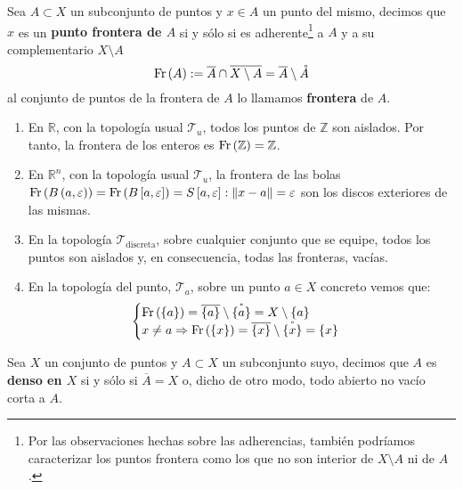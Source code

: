\begin{defi}[Frontera]
Sea $A\subset X$ un subconjunto de puntos y $x\in A$ un punto del mismo, decimos que $x$ es un \textbf{punto frontera de $A$} si y sólo si es adherente\footnote{Por las observaciones hechas sobre las adherencias, también podríamos caracterizar los puntos frontera como los que no son interior de $X \setminus A$ ni de $A$.} a $A$ y a su complementario $X \setminus A$
    \[
    \operatorname{Fr}\left( A \right) := \overline{A} \cap \overline{X \setminus A} = \overline{A} \setminus \mathring{A}     
    \]
al conjunto de puntos de la frontera de $A$ lo llamamos \textbf{frontera} de $A$.
\end{defi}

\begin{ej}
\begin{enumerate}
    \item En $\mathbb{R}$, con la topología usual $\mathcal{T}_u$, todos los puntos de $\mathbb{Z}$ son aislados. Por tanto, la frontera de los enteros es $\operatorname{Fr}\left( \mathbb{Z} \right) = \mathbb{Z}$.
    \item En $\mathbb{R}^n$, con la topología usual $\mathcal{T}_u$, la frontera de las bolas $\operatorname{Fr}\left( B\left( a, \varepsilon \right) \right) = \operatorname{Fr}\left( B\left[ a, \varepsilon \right] \right) = S\left[ a, \varepsilon \right] : \lVert x - a \rVert = \varepsilon$ son los discos exteriores de las mismas.
    \item En la topología $\mathcal{T}_{\text{discreta}}$, sobre cualquier conjunto que se equipe, todos los puntos son aislados y, en consecuencia, todas las fronteras, vacías.
    \item En la topología del punto, $\mathcal{T}_a$, sobre un punto $a \in X$ concreto vemos que:
$$
\begin{cases}
	\operatorname{Fr}\left( \{a\} \right) = \overline{\{a\}} \setminus \mathring{\{a\}} = X \setminus \{a\} \\
    x \neq a \Rightarrow \operatorname{Fr}\left( \{x\} \right) = \overline{\{x\}} \setminus \mathring{\{x\}} = \{x\} 
\end{cases} 
$$
\end{enumerate}
\end{ej}

\begin{defi}[Densidad]
Sea $X$ un conjunto de puntos y $A \subset X$ un subconjunto suyo, decimos que $A$ es \textbf{denso en $X$} si y sólo si $\overline{A} = X$ o, dicho de otro modo, todo abierto no vacío corta a $A$.
\end{defi}

